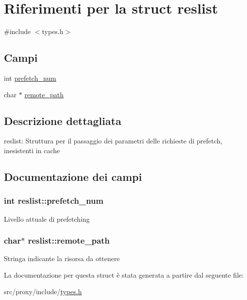 \hypertarget{structreslist}{
\section{Riferimenti per la struct reslist}
\label{structreslist}
}


{\ttfamily \#include $<$types.h$>$}

\subsection*{Campi}
{\bf }\par
\begin{DoxyCompactItemize}
\item 
int \hyperlink{structreslist_af9f8c3937012dd9cb2c9e23d9f1b26b6}{prefetch\_\-num}
\item 
char $\ast$ \hyperlink{structreslist_a4d68e4d0391bee43195113957429e1e3}{remote\_\-path}
\end{DoxyCompactItemize}



\subsection{Descrizione dettagliata}
reslist: Struttura per il passaggio dei parametri delle richieste di prefetch, inesistenti in cache 

\subsection{Documentazione dei campi}
\hypertarget{structreslist_af9f8c3937012dd9cb2c9e23d9f1b26b6}{
\subsubsection[{prefetch\_\-num}]{\setlength{\rightskip}{0pt plus 5cm}int {\bf reslist::prefetch\_\-num}}}
\label{structreslist_af9f8c3937012dd9cb2c9e23d9f1b26b6}
Livello attuale di prefetching \hypertarget{structreslist_a4d68e4d0391bee43195113957429e1e3}{
\subsubsection[{remote\_\-path}]{\setlength{\rightskip}{0pt plus 5cm}char$\ast$ {\bf reslist::remote\_\-path}}}
\label{structreslist_a4d68e4d0391bee43195113957429e1e3}
Stringa indicante la risorsa da ottenere 

La documentazione per questa struct è stata generata a partire dal seguente file:\begin{DoxyCompactItemize}
\item 
src/proxy/include/\hyperlink{types_8h}{types.h}\end{DoxyCompactItemize}
